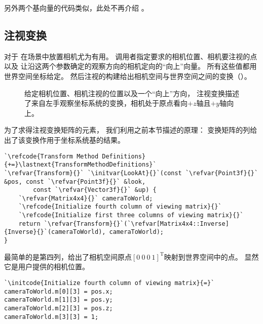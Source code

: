 另外两个基向量的代码类似，此处不再介绍
。

\subsection{注视变换}\label{sub:注视变换}
对于
在场景中放置相机尤为有用。
调用者指定要求的相机位置、相机要注视的点以及
让沿这两个参数确定的观察方向的相机定向的“向上”向量。
所有这些值都用世界空间坐标给定。
然后注视的构建给出相机空间与世界空间之间的变换（）。
\begin{figure}[htbp]
    \centering
    \caption{给定相机位置、相机注视的位置以及一个“向上”方向，
        注视变换描述了来自左手观察坐标系统的变换，相机处于原点看向$+z$轴且$+y$轴向上。}
    \label{fig:2.13}
\end{figure}

为了求得注视变换矩阵的元素，
我们利用之前本节描述的原理：
变换矩阵的列给出了该变换作用于坐标系统基的结果。
\begin{lstlisting}
`\refcode{Transform Method Definitions}{+=}\lastnext{TransformMethodDefinitions}`
`\refvar{Transform}{}` `\initvar{LookAt}{}`(const `\refvar{Point3f}{}` &pos, const `\refvar{Point3f}{}` &look,
        const `\refvar{Vector3f}{}` &up) {
    `\refvar{Matrix4x4}{}` cameraToWorld;
    `\refcode{Initialize fourth column of viewing matrix}{}`
    `\refcode{Initialize first three columns of viewing matrix}{}`
    return `\refvar{Transform}{}`(`\refvar[Matrix4x4::Inverse]{Inverse}{}`(cameraToWorld), cameraToWorld);
}
\end{lstlisting}

最简单的是第四列，给出了相机空间原点$[0\ 0\ 0\ 1]^\mathrm{T}$映射到世界空间中的点。
显然它是用户提供的相机位置。
\begin{lstlisting}
`\initcode{Initialize fourth column of viewing matrix}{=}`
cameraToWorld.m[0][3] = pos.x;
cameraToWorld.m[1][3] = pos.y;
cameraToWorld.m[2][3] = pos.z;
cameraToWorld.m[3][3] = 1;
\end{lstlisting}

